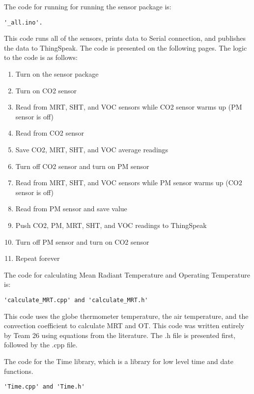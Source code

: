 \documentclass[12pt,letterpaper,titlepage]{article}
\begin{document}
\maketitle
The code for running for running the sensor package is:
\begin{verbatim}
'_all.ino'.
\end{verbatim}
This code runs all of the sensors, prints data to Serial connection, and publishes the data to ThingSpeak. The code is presented on the following pages. The logic to the code is as follows:
\begin{enumerate}
\setlength{\itemsep}{1pt}
\item Turn on the sensor package
\item Turn on CO2 sensor
\item Read from MRT, SHT, and VOC sensors while CO2 sensor warms up (PM sensor is off)
\item Read from CO2 sensor
\item Save CO2, MRT, SHT, and VOC average readings
\item Turn off CO2 sensor and turn on PM sensor
\item Read from MRT, SHT, and VOC sensors while PM sensor warms up (CO2 sensor is off)
\item Read from PM sensor and save value
\item Push CO2, PM, MRT, SHT, and VOC readings to ThingSpeak
\item Turn off PM sensor and turn on CO2 sensor
\item Repeat forever
\end{enumerate}

The code for calculating Mean Radiant Temperature and Operating Temperature is:
\begin{verbatim}
'calculate_MRT.cpp' and 'calculate_MRT.h'
\end{verbatim}
This code uses the globe thermometer temperature, the air temperature, and the convection coefficient to calculate MRT and OT. This code was written entirely by Team 26 using equations from the literature. The .h file is presented first, followed by the .cpp file.


The code for the Time library, which is a library for low level time and date functions.
\begin{verbatim}
'Time.cpp' and 'Time.h'
\end{verbatim}
\end{document}
